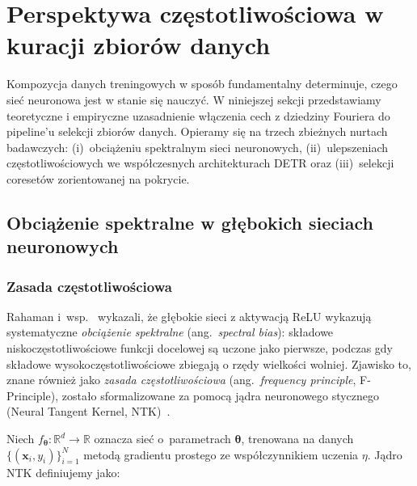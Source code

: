 
\section{Perspektywa częstotliwościowa w kuracji zbiorów danych}
\label{sec:fourier_research}

Kompozycja danych treningowych w sposób fundamentalny determinuje, czego sieć
neuronowa jest w stanie się nauczyć.  W niniejszej sekcji przedstawiamy
teoretyczne i empiryczne uzasadnienie włączenia cech z dziedziny Fouriera do
pipeline'u selekcji zbiorów danych.  Opieramy się na trzech zbieżnych nurtach
badawczych: (i)~obciążeniu spektralnym sieci neuronowych, (ii)~ulepszeniach
częstotliwościowych we współczesnych architekturach DETR oraz
(iii)~selekcji coresetów zorientowanej na pokrycie.


\subsection{Obciążenie spektralne w głębokich sieciach neuronowych}
\label{sec:spectral_bias_theory}

\subsubsection{Zasada częstotliwościowa}

Rahaman i~wsp.~\cite{rahaman2019spectral} wykazali, że głębokie sieci z
aktywacją ReLU wykazują systematyczne \emph{obciążenie spektralne} (ang.\
\emph{spectral bias}): składowe niskoczęstotliwościowe funkcji docelowej są
uczone jako pierwsze, podczas gdy składowe wysokoczęstotliwościowe zbiegają
o rzędy wielkości wolniej.  Zjawisko to, znane również jako \emph{zasada
częstotliwościowa} (ang.\ \emph{frequency principle}, F-Principle), zostało
sformalizowane za pomocą jądra neuronowego stycznego (Neural Tangent Kernel,
NTK)~\cite{jacot2018ntk}.

Niech $f_{\boldsymbol{\theta}}: \mathbb{R}^d \to \mathbb{R}$ oznacza sieć
o~parametrach $\boldsymbol{\theta}$, trenowana na danych
$\{(\mathbf{x}_i, y_i)\}_{i=1}^N$ metodą gradientu prostego ze współczynnikiem
uczenia $\eta$.  Jądro NTK definiujemy jako:

